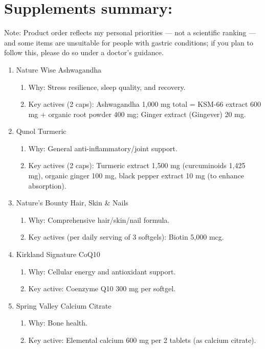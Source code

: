 \section{Supplements summary:} 
\label{sec:Supplements}
Note: Product order reflects my personal priorities — not a scientific ranking — and some items are unsuitable for people with gastric conditions; if you plan to follow this, please do so under a doctor’s guidance.
\begin{enumerate}
    \item Nature Wise Ashwagandha  
    \begin{enumerate}
        \item Why: Stress resilience, sleep quality, and recovery.
        \item Key actives (2 caps): Ashwagandha 1,000 mg total = KSM-66 extract 600 mg + organic root powder 400 mg; Ginger extract (Gingever) 20 mg.
    \end{enumerate}

    \item Qunol Turmeric
    \begin{enumerate}
        \item Why: General anti-inflammatory/joint support.
        \item Key actives (2 caps): Turmeric extract 1,500 mg (curcuminoids 1,425 mg), organic ginger 100 mg, black pepper extract 10 mg (to enhance absorption).
    \end{enumerate}

    \item Nature’s Bounty Hair, Skin \& Nails 
    \begin{enumerate}
        \item Why: Comprehensive hair/skin/nail formula.
        \item Key actives (per daily serving of 3 softgels): Biotin 5,000 mcg.
    \end{enumerate}
    
    \item Kirkland Signature CoQ10 
    \begin{enumerate}
        \item Why: Cellular energy and antioxidant support.
        \item Key active: Coenzyme Q10 300 mg per softgel.
    \end{enumerate}
    
    \item Spring Valley Calcium Citrate
    \begin{enumerate}
        \item Why: Bone health.
        \item Key active: Elemental calcium 600 mg per 2 tablets (as calcium citrate).
    \end{enumerate}
    

\end{enumerate}
